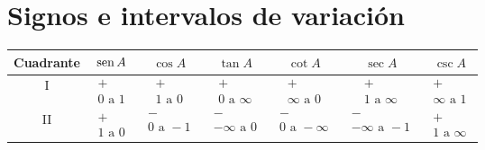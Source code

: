 \section*{Signos e intervalos de variación}
\begin{table}[htb]
\centering
\begin{tabular}{|c|c|c|c|c|c|c|}
\hline
Cuadrante & $\operatorname{sen} A$ & $\cos A$ & $\tan A$ & $\cot A$ & $\sec A$  & $\csc A$ \\ \hline
I         & $\begin{matrix}+\\ 0\,\, \mathrm{a}\,\, 1\end{matrix}$   & $\begin{matrix}+\\ 1\,\, \mathrm{a}\,\, 0\end{matrix}$   & $\begin{matrix}+\\ 0\,\, \mathrm{a}\,\, \infty \end{matrix}$   & $\begin{matrix}+\\ \infty\,\, \mathrm{a}\,\, 0\end{matrix}$  &  $\begin{matrix}+\\ 1\,\, \mathrm{a}\,\, \infty\end{matrix}$   & $\begin{matrix}+\\ \infty\,\, \mathrm{a}\,\, 1\end{matrix}$  \\ \hline
II        & $\begin{matrix}+\\ 1\,\, \mathrm{a}\,\, 0\end{matrix}$   & $\begin{matrix}-\\ 0\,\, \mathrm{a}\,\, -1\end{matrix}$  & $\begin{matrix}-\\ -\infty\,\, \mathrm{a}\,\, 0\end{matrix}$   & $\begin{matrix}-\\ 0\,\, \mathrm{a}\,\, -\infty\end{matrix}$   & $\begin{matrix}-\\ -\infty\,\, \mathrm{a}\,\, -1\end{matrix}$   & $\begin{matrix}+\\ 1\,\, \mathrm{a}\,\, \infty\end{matrix}$   \\ \hline

\end{tabular}
\end{table}
